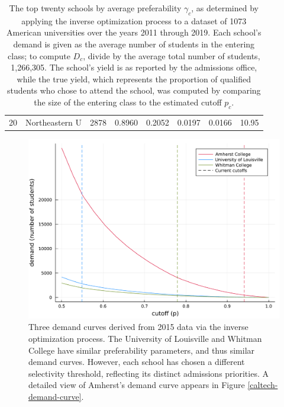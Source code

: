 \documentclass[12pt]{article}
\numberwithin{equation}{subsection}
\theoremstyle{definition}
\begin{document}
\begin{table}[]
\begin{tabular}{r|lrrrrrr}
20            & Northeastern U                        & 2878            & 0.8960                                                          & 0.2052         & 0.0197              & 0.0166                                                                   & 10.95                                                                   
\end{tabular}
\normalsize \caption{\label{tab:US-inverse-optimization}
The top twenty schools by average preferability $\gamma_c$, as determined by applying the inverse optimization process to a dataset of 1073 American universities over the years 2011 through 2019. Each school's demand is given as the average number of students in the entering class; to compute $D_c$, divide by the average total number of students, 1,266,305. The school's yield is as reported by the admissions office, while the true yield, which represents the proportion of qualified students who chose to attend the school, was computed by comparing the size of the entering class to the estimated cutoff $p_c$.}
\end{table}





\begin{figure}
\begin{center}\includegraphics[width=\linewidth, ]{singlescoreplots/three-demand-curves.pdf}\end{center}
\captionsetup{singlelinecheck=off}
    \caption[.]{Three demand curves derived from 2015 data via the inverse optimization process. The University of Louisville and Whitman College have similar preferability parameters, and thus similar demand curves. However, each school has chosen a different selectivity threshold, reflecting its distinct admissions priorities. A detailed view of Amherst's demand curve appears in Figure \ref{caltech-demand-curve}.}
\label{three-demand-curves}
\end{figure}
\end{document}
